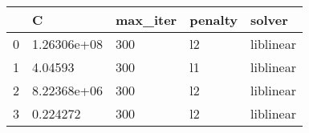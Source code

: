 \begin{tabular}{lllll}
\toprule
{} &            C & max\_iter & penalty &     solver \\
\midrule
0 &  1.26306e+08 &      300 &      l2 &  liblinear \\
1 &      4.04593 &      300 &      l1 &  liblinear \\
2 &  8.22368e+06 &      300 &      l2 &  liblinear \\
3 &     0.224272 &      300 &      l2 &  liblinear \\
\bottomrule
\end{tabular}
